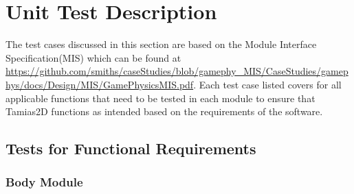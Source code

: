 \documentclass[12pt, titlepage]{article}
\newcommand{\progname}{Tamias2D}
\begin{document}
\section{Unit Test Description}
The test cases discussed in this section are based on the Module Interface Specification(MIS) which can be found at \url{https://github.com/smiths/caseStudies/blob/gamephy_MIS/CaseStudies/gamephys/docs/Design/MIS/GamePhysicsMIS.pdf}. Each test case listed covers for all applicable functions that need to be tested in each module to ensure that \progname{} functions as intended based on the requirements of the software.
	
\subsection{Tests for Functional Requirements}

\subsubsection{Body Module}
		
\end{document}
